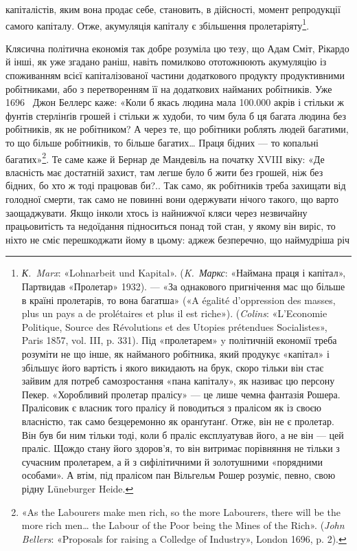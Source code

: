 капіталістів, яким вона продає себе, становить, в дійсності,
момент репродукції самого капіталу. Отже, акумуляція
капіталу є збільшення пролетаріяту\footnote{
\emph{К.~Marx}: «Lohnarbeit und Kapital». (\emph{K.~Маркс}: «Наймана праця
і капітал», Партвидав «Пролетар» 1932). — «За однакового пригнічення
мас що більше в країні пролетарів, то вона багатша» («A égalité
d’oppression des masses, plus un pays a de prolétaires et plus il est riche»).
(\emph{Colins}: «L’Economie Politique, Source des Révolutions et des Utopies
prétendues Socialistes», Paris 1857, vol. III, p. 331). Під «пролетарем»
y політичній економії треба розуміти не що інше, як найманого робітника,
який продукує «капітал» і збільшує його вартість і якого викидають
на брук, скоро тільки він стає зайвим для потреб самозростання
«пана капіталу», як називає цю персону Пекер. «Хоробливий пролетар
пралісу» — це лише чемна фантазія Рошера. Пралісовик є власник того
пралісу й поводиться з пралісом як із своєю власністю, так само безцеремонно
як оранґутанґ. Отже, він не є пролетар. Він був би ним тільки
тоді, коли б праліс експлуатував його, а не він — цей праліс. Щождо
стану його здоров'я, то він витримає порівняння не тільки з сучасним
пролетарем, а й з сифілітичними й золотушними «порядними особами».
А втім, під пралісом пан Вільгельм Рошер розуміє, певно, свою рідну
Lüneburger Heide.
}.

Клясична політична економія так добре розуміла цю тезу,
що Адам Сміт, Рікардо й інші, як уже згадано раніш, навіть помилково
ототожнюють акумуляцію із споживанням всієї капіталізованої
частини додаткового продукту продуктивними робітниками,
або з перетворенням її на додаткових найманих робітників.
Уже 1696~ Джон Беллерс каже: «Коли б якась людина
мала \num{100.000} акрів і стільки ж фунтів стерлінґів грошей і стільки
ж худоби, то чим була б ця багата людина без робітників, як не
робітником? А через те, що робітники роблять людей багатими,
то що більше робітників, то більше багатих\dots{} Праця бідних — то
копальні багатих»\footnote{
«As the Labourers make men rich, so the more Labourers, there
will be the more rich men\dots{} the Labour of the Poor being the Mines of the
Rich». (\emph{John Bellers}: «Proposals for raising a Colledge of Industry»,
London 1696, p. 2).
}. Те саме каже й Бернар де Мандевіль
на початку XVIII віку: «Де власність має достатній захист, там
легше було б жити без грошей, ніж без бідних, бо хто ж тоді
працював би?.. Так само, як робітників треба захищати від голодної
смерти, так само не повинні вони одержувати нічого
такого, що варто заощаджувати. Якщо інколи хтось із найнижчої
кляси через незвичайну працьовитість та недоїдання підноситься
понад той стан, у якому він виріс, то ніхто не сміє перешкоджати
йому в цьому: аджеж безперечно, що наймудріша річ
\parbreak{}  %
